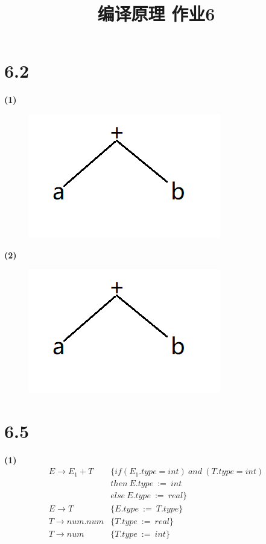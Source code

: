\documentclass{article}
\title{编译原理 作业6}
\author{}
\date{}
\begin{document}
\section*{6.2}
\noindent

\textbf{(1)}
\begin{figure}[htbp]
\centering
\includegraphics[scale=0.7]{5_1.png}
\end{figure} 

\textbf{(2)}
\begin{figure}[htbp]
\centering
\includegraphics[scale=0.7]{5_1.png}
\end{figure} 

\section*{6.5}
\noindent

\textbf{(1)}
\begin{align*}
    E\rightarrow E_1+T\ \ \ \ &\{if(E_1.type=int)\ and\ (T.type=int)\\
&then\ E.type\ :=\ int\\
&else\ E.type\ :=\ real\}\\
E\rightarrow T\ \ \ \ \ \ \ \ \ \ \ \ &\{E.type\ :=\ T.type\}\\
T\rightarrow num.num&\{T.type\ :=\ real\}\\
T\rightarrow num\ \ \ \ \ \ \ \ &\{T.type\ :=\ int\}
\end{align*}
\end{document}
